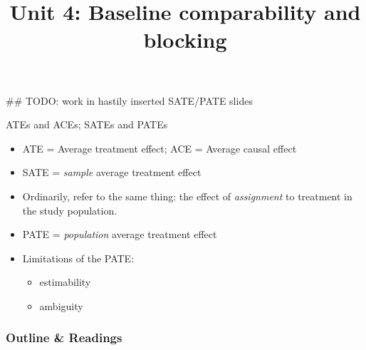 ## TODO: work in hastily inserted SATE/PATE slides
%

%

%





\title{Unit 4: Baseline comparability and blocking}





\begin{frame}{ATEs and ACEs; SATEs and PATEs}

  \begin{itemize}
  \item ATE = Average treatment effect; ACE = Average causal effect

  \item SATE = \textit{sample} average treatment effect
  \item Ordinarily, refer to the same thing: the effect of \textit{assignment} to treatment in the study population.
  \item PATE = \textit{population} average treatment effect
  \item Limitations of the PATE:
    \begin{itemize}
    \item estimability
    \item ambiguity
    \end{itemize}

  \end{itemize}

\end{frame}



  \begin{frame}
    \frametitle{Outline \& Readings}

\tableofcontents[subsectionstyle=show/hide/hide]



\end{frame}
